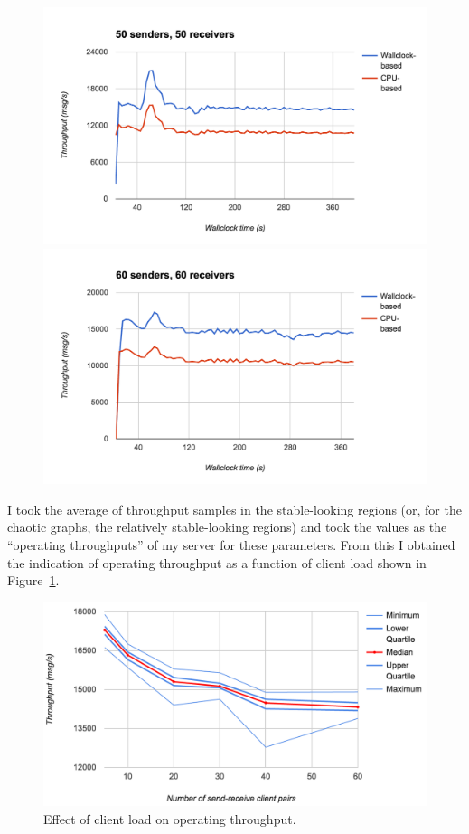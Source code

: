 \begin{figure}
  \centering\includegraphics[width=\textwidth]{../transcripts/lipsum/50n50/50n50.png}

  \centering\includegraphics[width=\textwidth]{../transcripts/lipsum/60n60/60n60.png}
\end{figure}

I took the average of throughput samples in the stable-looking regions (or, for the chaotic graphs, the relatively stable-looking regions) and took the values as the ``operating throughputs'' of my server for these parameters. From this I obtained the indication of operating throughput as a function of client load shown in Figure~\ref{fig:summary}.

\begin{figure}
  \centering\includegraphics[width=\textwidth]{../transcripts/lipsum/throughp_clients.png}
  \caption{Effect of client load on operating throughput.}
  \label{fig:summary}
\end{figure}
